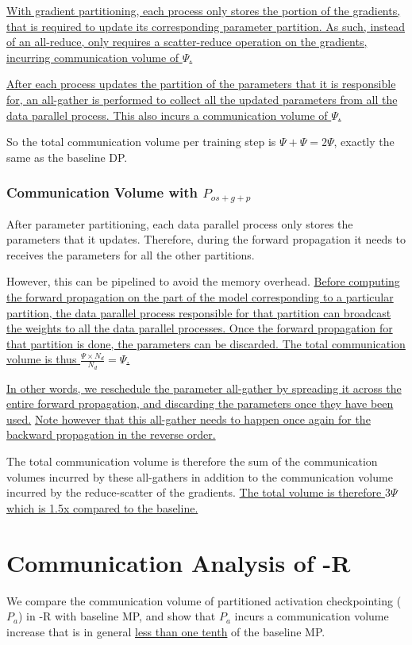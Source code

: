 \uline{With gradient partitioning, each process only stores the portion of the gradients, that is required to update its corresponding parameter partition. As such, instead of an all-reduce, \name only requires a scatter-reduce operation on the gradients, incurring communication volume of $\Psi$.}

\uline{After each process updates the partition of the parameters that it is responsible for, an all-gather is performed to collect all the updated parameters from all the data parallel process. This also incurs a communication volume of $\Psi$.}

So the total communication volume per training step is $\Psi+\Psi= 2\Psi$, exactly the same as the baseline DP.

\subsubsection{Communication Volume with $P_{os+g+p}$ }

After parameter partitioning, each data parallel process only stores the parameters that it updates. Therefore, during the forward propagation it needs to receives the parameters for all the other partitions.

However, this can be pipelined to avoid the memory overhead. \uline{Before computing the forward propagation on the part of the model corresponding to a particular partition, the data parallel process responsible for that partition can broadcast the weights to all the data parallel processes. Once the forward propagation for that partition is done, the parameters can be discarded. The total communication volume is thus $\frac{\Psi \times N_d}{N_d} = \Psi$.}

\uline{In other words, we reschedule the parameter all-gather by spreading it across the entire forward propagation, and discarding the parameters once they have been used.} \uline{Note however that this all-gather needs to happen once again for the backward propagation in the reverse order.}

The total communication volume is therefore the sum of the communication volumes incurred by these all-gathers in addition to the communication volume incurred by the reduce-scatter of the gradients. \uline{The total volume is therefore $3\Psi$ which is 1.5x compared to the baseline.}

\section{Communication Analysis of \name-R}
We compare the communication volume of partitioned activation checkpointing ($P_a$) in \name-R with baseline MP, and show that $P_a$ incurs a communication volume increase that is in general \uline{less than one tenth} of the baseline MP.

